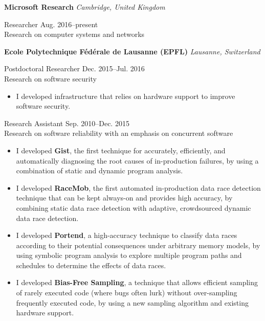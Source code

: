 \documentclass[10pt]{article}
\newcommand{\mysub}[3]{\textbf{#1} {#2} \hfill {\em #3}}
\newcommand{\myssub}[1]{\hspace*{2mm}\parbox{163mm}{#1}\vspace*{2mm}}
\begin{document}
\mysub{Microsoft Research}{}{Cambridge, United Kingdom} \\
\myssub{\vspace{1mm}Researcher \hfill Aug. 2016--present \\
Research on computer systems and networks
}

\mysub{Ecole Polytechnique F\'ed\'erale de Lausanne (EPFL)}{}{Lausanne, Switzerland} \\
\myssub{\vspace{1mm}Postdoctoral Researcher \hfill Dec. 2015--Jul. 2016 \\
Research on software security
\begin{itemize}
\item{I developed infrastructure that relies on hardware support to improve software security.}
\end{itemize}
}

\myssub{\vspace{1mm}Research Assistant \hfill Sep. 2010--Dec. 2015 \\
Research on software reliability with an emphasis on concurrent software
\vspace{-1mm}
\begin{itemize}
\setlength\itemsep{0em}
\item{I developed \textbf{Gist}, the first technique for accurately, efficiently, and automatically diagnosing the root causes of in-production failures, by using a combination of static and dynamic program analysis.}
\item{I developed \textbf{RaceMob}, the first automated in-production data race detection technique that can be kept always-on and provides high accuracy, by combining static data race detection with adaptive, crowdsourced dynamic data race detection.}
\item{I developed \textbf{Portend}, a high-accuracy technique to classify data races according to their potential consequences under arbitrary memory models, by using symbolic program analysis to explore multiple program paths and schedules to determine the effects of data races.}
\item{I developed \textbf{Bias-Free Sampling}, a technique that allows efficient sampling of rarely executed code (where bugs often lurk) without over-sampling frequently executed code, by using a new sampling algorithm and existing hardware support.}\\
\end{itemize}
\vspace{-5mm}
}
\end{document}
